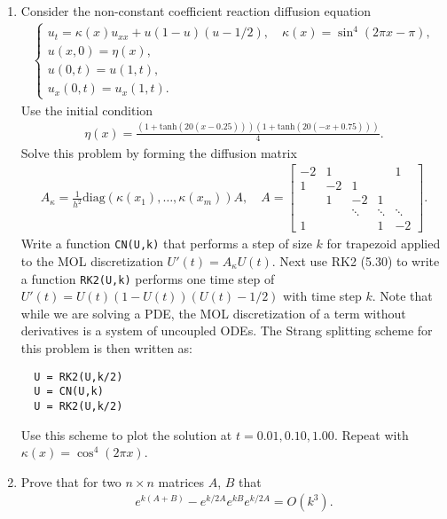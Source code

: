\documentclass[10pt]{amsart}
\begin{document}
\begin{enumerate}[label={\bf Problem~{\arabic*}:}]
\mline
\item Consider the non-constant coefficient reaction diffusion equation
  \begin{align*}
    \begin{cases}
      u_t = \kappa(x) u_{xx} + u(1-u)(u-1/2), \quad \kappa(x) = \sin^4(2\pi x - \pi),\\
      u(x,0) = \eta(x),\\
      u(0,t) = u(1,t),\\
      u_x(0,t) = u_x(1,t).
    \end{cases}
  \end{align*}
  Use the initial condition
  \begin{align*}
    \eta(x) = \frac{ ( 1 + \mathrm{tanh}(20(x-0.25)) ) ( 1 + \mathrm{tanh}(20(-x+0.75)))}{4}.
  \end{align*}
  Solve this problem by forming the diffusion matrix
  \begin{align*}
    A_{\kappa} = \frac{1}{h^2} \mathrm{diag}(\kappa(x_1),\ldots,\kappa(x_m)) A, \quad A  = \begin{bmatrix}
-2  & 1 &&& 1\\
1 & -2 & 1 \\
& 1 & -2 & 1\\
&& \ddots & \ddots & \ddots \\
1&&& 1 & -2 \end{bmatrix}.
  \end{align*}
  Write a function {\tt CN(U,k)} that performs a step of size $k$ for trapezoid applied to the MOL discretization $U'(t) = A_{\kappa} U(t)$.  Next use RK2 (5.30) to write a function {\tt RK2(U,k)} performs one time step of $U'(t) = U(t)(1-U(t))(U(t) - 1/2)$ with time step $k$.  Note that while we are solving a PDE, the MOL discretization of a term without derivatives is a system of uncoupled ODEs.  The Strang splitting scheme for this problem is then written as:
\begin{verbatim}
  U = RK2(U,k/2)
  U = CN(U,k)
  U = RK2(U,k/2)
\end{verbatim}
Use this scheme to plot the solution at $t = 0.01,0.10,1.00$.  Repeat with $\kappa(x) = \cos^4(2\pi x)$.



\mline

\item Prove that for two $n \times n$ matrices $A$, $B$ that
  \begin{align*}
    e^{k(A+B)} - e^{k/2 A}e^{k B}e^{k/2 A} = O(k^3).
  \end{align*}


\end{enumerate}
\end{document}
